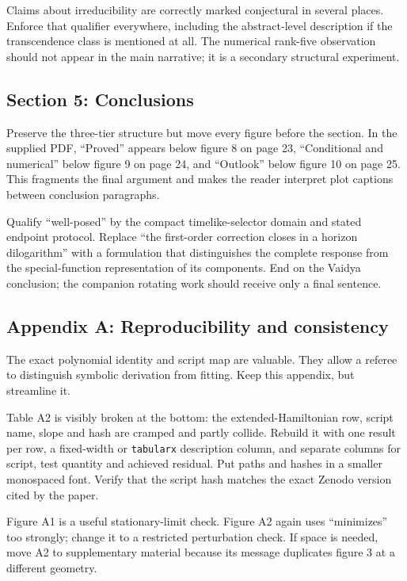 \documentclass[11pt,a4paper]{article}
\begin{document}
Claims about irreducibility are correctly marked conjectural in several places.  Enforce that
qualifier everywhere, including the abstract-level description if the transcendence class is
mentioned at all.  The numerical rank-five observation should not appear in the main narrative;
it is a secondary structural experiment.

\subsection{Section 5: Conclusions}

Preserve the three-tier structure but move every figure before the section.  In the supplied PDF,
``Proved'' appears below figure 8 on page 23, ``Conditional and numerical'' below figure 9 on page
24, and ``Outlook'' below figure 10 on page 25.  This fragments the final argument and makes the
reader interpret plot captions between conclusion paragraphs.

Qualify ``well-posed'' by the compact timelike-selector domain and stated endpoint protocol.
Replace ``the first-order correction closes in a horizon dilogarithm'' with a formulation that
distinguishes the complete response from the special-function representation of its components.
End on the Vaidya conclusion; the companion rotating work should receive only a final sentence.

\subsection{Appendix A: Reproducibility and consistency}

The exact polynomial identity and script map are valuable.  They allow a referee to distinguish
symbolic derivation from fitting.  Keep this appendix, but streamline it.

Table A2 is visibly broken at the bottom: the extended-Hamiltonian row, script name, slope and hash
are cramped and partly collide.  Rebuild it with one result per row, a fixed-width or
\texttt{tabularx} description column, and separate columns for script, test quantity and achieved
residual.  Put paths and hashes in a smaller monospaced font.  Verify that the script hash matches
the exact Zenodo version cited by the paper.

Figure A1 is a useful stationary-limit check.  Figure A2 again uses ``minimizes'' too strongly;
change it to a restricted perturbation check.  If space is needed, move A2 to supplementary
material because its message duplicates figure 3 at a different geometry.
\end{document}
